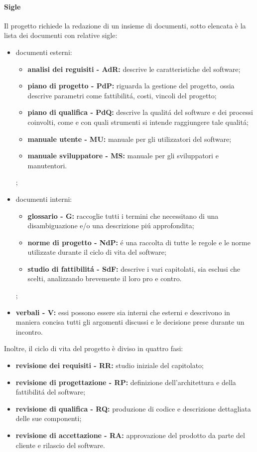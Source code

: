 			\paragraph{Sigle}
				Il progetto richiede la redazione di un insieme di documenti, sotto elencata è la lista dei documenti con relative sigle:
				\begin{itemize}
					\item documenti esterni:
						\begin{itemize}
							\item \textbf{analisi dei reguisiti - AdR:} descrive le caratteristiche del software;
							\item \textbf{piano di progetto - PdP:} riguarda la gestione del progetto, ossia descrive parametri come fattibilitá, costi, vincoli del progetto;
							\item \textbf{piano di qualifica - PdQ:} descrive la qualitá del software e dei processi coinvolti, come e con quali strumenti si intende raggiungere tale qualitá;
							\item \textbf{manuale utente - MU:} manuale per gli utilizzatori del software;
							\item \textbf{manuale sviluppatore - MS:} manuale per gli sviluppatori e manutentori.
						\end{itemize};
					\item documenti interni:
						\begin{itemize}
							\item \textbf{glossario - G:} raccoglie tutti i termini che necessitano di una disambiguazione e/o una descrizione piú approfondita;
							\item \textbf{norme di progetto - NdP:} é una raccolta di tutte le regole e le norme utilizzate durante il ciclo di vita del software;
							\item \textbf{studio di fattibilitá - SdF:} descrive i vari capitolati, sia esclusi che scelti, analizzando brevemente il loro pro e contro.
						\end{itemize};
					\item \textbf{verbali - V:} essi possono essere sia interni che esterni e descrivono in maniera concisa tutti gli argomenti discussi e le decisione prese durante un incontro.
				\end{itemize}
				Inoltre, il ciclo di vita del progetto è diviso in quattro fasi:
				\begin{itemize}
					\item \textbf{revisione dei requisiti - RR:} studio iniziale del capitolato;
					\item \textbf{revisione di progettazione - RP:} definizione dell'architettura e della fattibilitá del software;
					\item \textbf{revisione di qualifica - RQ:} produzione di codice e descrizione dettagliata delle sue componenti;
					\item \textbf{revisione di accettazione - RA:} approvazione del prodotto da parte del cliente e rilascio del software.
				\end{itemize}

